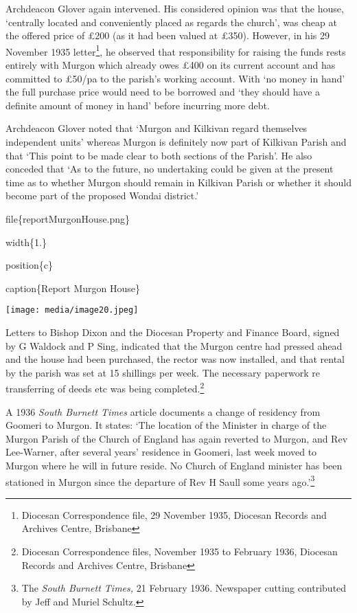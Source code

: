 Archdeacon Glover again intervened. His considered opinion was that the house, `centrally located and conveniently placed as regards the church', was cheap at the offered price of £200 (as it had been valued at £350). However, in his 29 November 1935 letter\footnote{Diocesan Correspondence file, 29 November 1935, Diocesan Records and Archives Centre, Brisbane}, he observed that responsibility for raising the funds rests entirely with Murgon which already owes £400 on its current account and has committed to £50/pa to the parish's working account. With `no money in hand' the full purchase price would need to be borrowed and `they should have a definite amount of money in hand' before incurring more debt.

Archdeacon Glover noted that `Murgon and Kilkivan regard themselves independent units' whereas Murgon is definitely now part of Kilkivan Parish and that `This point to be made clear to both sections of the Parish'. He also conceded that `As to the future, no undertaking could be given at the present time as to whether Murgon should remain in Kilkivan Parish or whether it should become part of the proposed Wondai district.'

file\{reportMurgonHouse.png\}

width\{1.\}

position\{c\}

caption\{Report Murgon House\}

\texttt{[image: media/image20.jpeg]}

Letters to Bishop Dixon and the Diocesan Property and Finance Board, signed by G Waldock and P Sing, indicated that the Murgon centre had pressed ahead and the house had been purchased, the rector was now installed, and that rental by the parish was set at 15 shillings per week. The necessary paperwork re transferring of deeds etc was being completed.\footnote{Diocesan Correspondence files, November 1935 to February 1936, Diocesan Records and Archives Centre, Brisbane}

A 1936 \emph{South Burnett Times} article documents a change of residency from Goomeri to Murgon. It states: `The location of the Minister in charge of the Murgon Parish of the Church of England has again reverted to Murgon, and Rev Lee-Warner, after several years' residence in Goomeri, last week moved to Murgon where he will in future reside. No Church of England minister has been stationed in Murgon since the departure of Rev H Saull some years ago.'\footnote{The \emph{South Burnett Times,} 21 February 1936. Newspaper cutting contributed by Jeff and Muriel Schultz.}

